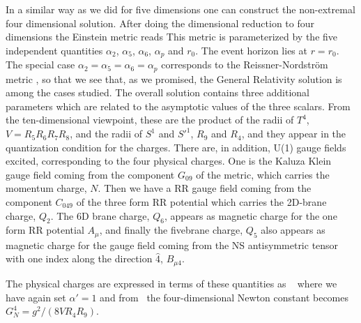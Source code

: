 In a similar way as we did for five dimensions one can 
construct the  non-extremal four dimensional solution.
After doing the dimensional reduction to four dimensions 
the Einstein metric reads \cvetd{}
\eqn{}
This metric is parameterized by the
five  independent quantities $\alpha_2$, $\alpha_5$,
$\alpha_6$, $\alpha_p$ and $r_0$.
 The event horizon lies at $r=r_0$. The special case $\alpha_2 = \alpha_5
 =\alpha_6=\alpha_p$ corresponds to the Reissner-Nordstr\"om metric
\renof , so that we see that, as we promised, the 
General Relativity solution is among the cases studied.
The overall solution contains three additional parameters
 which are related
to the asymptotic values of the three scalars. From the 
ten-dimensional
viewpoint, these are the product of the radii of $T^4$, $
V = R_5 R_6 R_7 R_8$,
and the  radii of $S^1$ and $ S'^1$, 
$R_9$ and $R_4$, and they appear in the quantization condition
for the charges.
There are, in addition, U(1) gauge fields excited, corresponding
to the four physical charges. One is 
the Kaluza Klein gauge field coming from the component
$G_{09} $ of the metric, which carries the momentum charge, $N$.
Then we have a RR gauge field coming from the component
$C_{049}$ of the three form RR potential which carries the 
2D-brane charge, $Q_2$. The 6D brane charge, $Q_6$,
 appears as magnetic
charge for the one form RR potential $A_\mu$, and finally the
fivebrane charge, $Q_5$ also appears as magnetic charge for
the gauge field coming  from the NS antisymmetric tensor with
one index along the direction $\hat 4$, 
 $ B_{\mu 4} $.

The physical charges are expressed in terms of these
quantities as \hlm\
\eqn{}
where
we have again set
$\alpha'=1$ and from \gten\  
the four-dimensional Newton constant becomes
 $G^4_N =  g^2/(8 V R_4 R_9)$.


